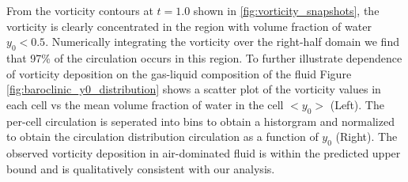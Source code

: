 From the vorticity contours at $t=1.0$ shown in
\ref{fig:vorticity_snapshots}, the vorticity is clearly concentrated
in the region with volume fraction of water $y_0<0.5$. Numerically
integrating the vorticity over the right-half domain we find that 97\%
of the circulation occurs in this region.  To further illustrate
dependence of vorticity deposition on the gas-liquid composition of
the fluid Figure \ref{fig:baroclinic_y0_distribution} shows a scatter
plot of the vorticity values in each cell vs the mean volume fraction
of water in the cell $<y_0>$ (Left). The per-cell circulation is
seperated into bins to obtain a historgram and normalized to obtain
the circulation distribution circulation as a function of $y_0$
(Right). The observed vorticity deposition in air-dominated fluid is
within the predicted upper bound and is qualitatively consistent with
our analysis.
% 
% 
